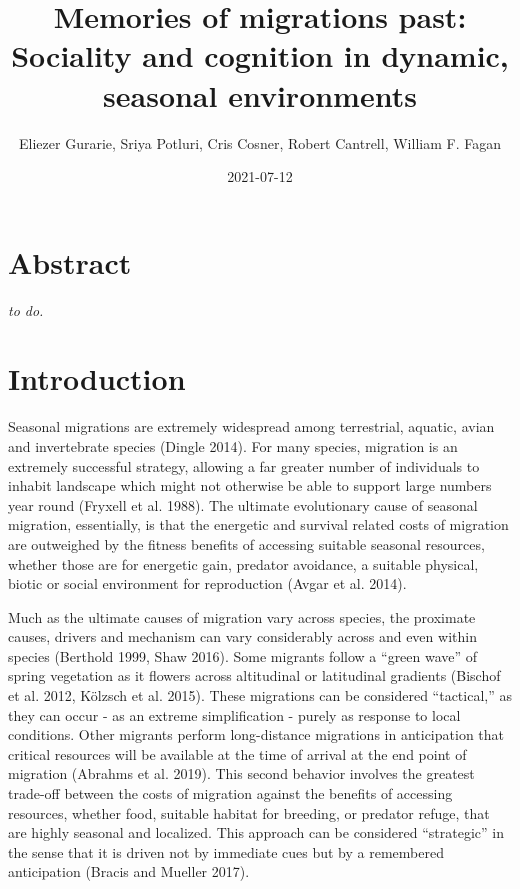 \documentclass[12pt]{article}
\title{Memories of migrations past: Sociality and cognition in dynamic,
seasonal environments}
\author{Eliezer Gurarie, Sriya Potluri, Cris Cosner, Robert Cantrell, William F. Fagan}
\date{2021-07-12}
\begin{document}
\maketitle

\hypertarget{abstract}{%
\section{Abstract}\label{abstract}}

\emph{to do.}

\hypertarget{introduction}{%
\section{Introduction}\label{introduction}}

Seasonal migrations are extremely widespread among terrestrial, aquatic,
avian and invertebrate species (Dingle 2014). For many species,
migration is an extremely successful strategy, allowing a far greater
number of individuals to inhabit landscape which might not otherwise be
able to support large numbers year round (Fryxell et al. 1988). The
ultimate evolutionary cause of seasonal migration, essentially, is that
the energetic and survival related costs of migration are outweighed by
the fitness benefits of accessing suitable seasonal resources, whether
those are for energetic gain, predator avoidance, a suitable physical,
biotic or social environment for reproduction (Avgar et al. 2014).

Much as the ultimate causes of migration vary across species, the
proximate causes, drivers and mechanism can vary considerably across and
even within species (Berthold 1999, Shaw 2016). Some migrants follow a
``green wave'' of spring vegetation as it flowers across altitudinal or
latitudinal gradients (Bischof et al. 2012, Kölzsch et al. 2015). These
migrations can be considered ``tactical,'' as they can occur - as an
extreme simplification - purely as response to local conditions. Other
migrants perform long-distance migrations in anticipation that critical
resources will be available at the time of arrival at the end point of
migration (Abrahms et al. 2019). This second behavior involves the
greatest trade-off between the costs of migration against the benefits
of accessing resources, whether food, suitable habitat for breeding, or
predator refuge, that are highly seasonal and localized. This approach
can be considered ``strategic'' in the sense that it is driven not by
immediate cues but by a remembered anticipation (Bracis and Mueller
2017).
\end{document}
